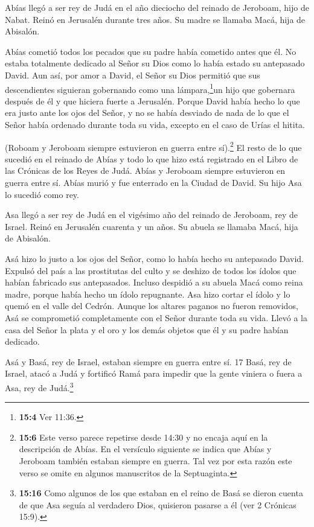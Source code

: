  Abías llegó a ser rey de Judá en el año dieciocho del
reinado de Jeroboam, hijo de Nabat.  Reinó en Jerusalén
durante tres años. Su madre se llamaba Macá, hija de Abisalón.

 Abías cometió todos los pecados que su padre había cometido
antes que él. No estaba totalmente dedicado al Señor su Dios como lo
había estado su antepasado David.  Aun así, por amor a
David, el Señor su Dios permitió que sus descendientes siguieran
gobernando como una lámpara,\footnote{\textbf{15:4} Ver 11:36.}un hijo
que gobernara después de él y que hiciera fuerte a Jerusalén.
 Porque David había hecho lo que era justo ante los ojos del
Señor, y no se había desviado de nada de lo que el Señor había ordenado
durante toda su vida, excepto en el caso de Urías el hitita.

 (Roboam y Jeroboam siempre estuvieron en guerra entre
sí).\footnote{\textbf{15:6} Este verso parece repetirse desde 14:30 y no
  encaja aquí en la descripción de Abías. En el versículo siguiente se
  indica que Abías y Jeroboam también estaban siempre en guerra. Tal vez
  por esta razón este verso se omite en algunos manuscritos de la
  Septuaginta.}  El resto de lo que sucedió en el reinado de
Abías y todo lo que hizo está registrado en el Libro de las Crónicas de
los Reyes de Judá. Abías y Jeroboam siempre estuvieron en guerra entre
sí.  Abías murió y fue enterrado en la Ciudad de David. Su
hijo Asa lo sucedió como rey.

 Asa llegó a ser rey de Judá en el vigésimo año del reinado
de Jeroboam, rey de Israel.  Reinó en Jerusalén cuarenta y
un años. Su abuela se llamaba Macá, hija de Abisalón.

 Asá hizo lo justo a los ojos del Señor, como lo había
hecho su antepasado David.  Expulsó del país a las
prostitutas del culto y se deshizo de todos los ídolos que habían
fabricado sus antepasados.  Incluso despidió a su abuela
Macá como reina madre, porque había hecho un ídolo repugnante. Asa hizo
cortar el ídolo y lo quemó en el valle del Cedrón.  Aunque
los altares paganos no fueron removidos, Asá se comprometió
completamente con el Señor durante toda su vida.  Llevó a
la casa del Señor la plata y el oro y los demás objetos que él y su
padre habían dedicado.

 Asá y Basá, rey de Israel, estaban siempre en guerra entre
sí. 17 Basá, rey de Israel, atacó a Judá y fortificó Ramá para impedir
que la gente viniera o fuera a Asa, rey de Judá.\footnote{\textbf{15:16}
  Como algunos de los que estaban en el reino de Basá se dieron cuenta
  de que Asa seguía al verdadero Dios, quisieron pasarse a él (ver 2
  Crónicas 15:9).}

